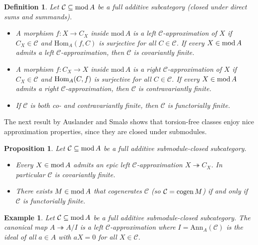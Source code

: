 \documentclass[a4paper]{amsart}
\newcommand{\Hom}{\textnormal{Hom}}
\renewcommand{\mod}{\textnormal{mod}\,}
\newcommand{\cogen}{\textnormal{cogen}\,}
\numberwithin{equation}{section} \theoremstyle{plain}
\numberwithin{thm}{section}
\newtheorem{prop}[thm]{Proposition}
\newtheorem{exa}[thm]{Example}
\newtheorem{df}[thm]{Definition}
\begin{document}
\begin{df}\rm Let $\mathcal{C} \subseteq \mod A$ be a full additive subcategory (closed under direct sums and summands).
\begin{itemize}
    \item[(1)] A morphism $f\colon X \to C_X$ inside $\mathrm{mod}\,A$ is a \emph{left $\mathcal{C}$-approximation} of $X$ if $C_X \in \mathcal{C}$ and $\mathrm{Hom}_A(f,C)$ is surjective for all $C\in \mathcal{C}$. If every $X \in \mod A$ admits a left $\mathcal{C}$-approximation, then $\mathcal{C}$ is \emph{covariantly finite}. 
    \item[(2)] A morphism $f\colon C_X \to X$ inside $\mathrm{mod}\,A$ is a \emph{right $\mathcal{C}$-approximation} of $X$ if $C_X \in \mathcal{C}$ and $\Hom_A(C,f)$ is surjective for all $C\in \mathcal{C}$. If every $X\in \mod A$ admits a right $\mathcal{C}$-approximation, then $\mathcal{C}$ is \emph{contravariantly finite}. 
    \item[(3)] If $\mathcal{C}$ is both co- and contravariantly finite, then $\mathcal{C}$ is \emph{functorially finite}.
\end{itemize} 
\end{df}
  
The next result by Auslander and Smal{\o} \cite{ASm} shows that torsion-free classes enjoy nice approximation properties, since they are closed under submodules. 

\begin{prop} \label{P: app}\cite[Proposition 4.7 and Proposition 4.8]{ASm} Let $\mathcal{C}\subseteq \mod A$ be a full additive submodule-closed subcategory.
\begin{itemize}
    \item[(1)] Every $X\in \mod A$ admits an epic left $\mathcal{C}$-approximation $X \twoheadrightarrow  C_X$. In particular $\mathcal{C}$ is covariantly finite.
    \item[(2)] There exists $M \in \mod A$ that cogenerates $\mathcal{C}$ (so $\mathcal{C} = \cogen M$) if and only if $\mathcal{C}$ is functorially finite.
\end{itemize}
\end{prop}

\begin{exa}\label{E: ideal}\rm Let $\mathcal{C} \subseteq \mod A$ be a full additive submodule-closed subcategory. The canonical map $A \twoheadrightarrow A/I$ is a left $\mathcal{C}$-approximation where $I = \mathrm{Ann}_A(\mathcal{C})$ is the  ideal of all $a\in A$ with $aX = 0$ for all $X\in \mathcal{C}$.
\end{exa}
\end{document}

